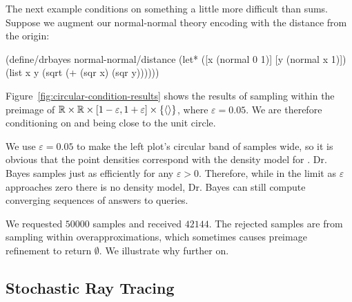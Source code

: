 The next example conditions on something a little more difficult than sums.
Suppose we augment our normal-normal theory encoding with the distance from the origin:
\begin{center}\singlespacing
\begin{schemedisplay}
(define/drbayes normal-normal/distance
  (let* ([x  (normal 0 1)]
         [y  (normal x 1)])
    (list x y (sqrt (+ (sqr x) (sqr y))))))
\end{schemedisplay}
\end{center}
Figure~\ref{fig:circular-condition-results} shows the results of sampling within the preimage of $\mathbb{R} \times \mathbb{R} \times [1-\varepsilon,1+\varepsilon] \times \{{\langle{}\rangle}\}$, where $\varepsilon = 0.05$.
We are therefore conditioning on  and  being close to the unit circle.

We use $\varepsilon = 0.05$ to make the left plot's circular band of samples wide, so it is obvious that the point densities correspond with the density model for .
Dr. Bayes samples just as efficiently for any $\varepsilon > 0$.
Therefore, while in the limit as $\varepsilon$ approaches zero there is no density model, Dr. Bayes can still compute converging sequences of answers to queries.

We requested $50000$ samples and received $42144$.
The rejected samples are from sampling within overapproximations, which sometimes causes preimage refinement to return $\emptyset$.
We illustrate why further on.


\subsection{Stochastic Ray Tracing}


